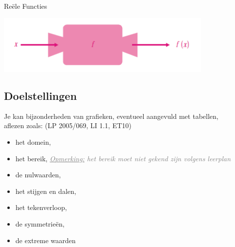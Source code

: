 \documentclass[12pt,twoside]{article}
\newcommand{\teacher}[1]{\textcolor{gray}{\emph{\underline{Opmerking:} #1}}}
\newcommand{\teacher}[1]{}
\begin{document}
\pagestyle{fancy}
\lhead{}

\begin{theorie}

  \thispagestyle{empty}
  \begin{center}
    \begin{mdframed}
      \centering
      \fontsize{35}{70}\selectfont Reële Functies
    \end{mdframed}
    \vfill
    \includegraphics[width=0.8\textwidth]{FunctieMachine}
    \vfill
  \end{center}
  \vspace*{-2cm}
  \subsection*{Doelstellingen}
  {\singlespacing

    Je kan bijzonderheden van grafieken,
    eventueel aangevuld met tabellen,\\ aflezen zoals: \hfill  {\scriptsize(LP 2005/069, LI 1.1, ET10)}
    \begin{itemize}
    \item het domein,
    \item het bereik, \teacher{het bereik moet niet gekend zijn volgens leerplan}
    \item de nulwaarden,
    \item het stijgen en dalen,
    \item het tekenverloop,
    \item de symmetrieën,
    \item de extreme waarden
    \end{itemize}
  }


\thispagestyle{empty}
\mbox{}
\newpage
\clearpage
\thispagestyle{empty}
\tableofcontents
\newpage
\clearpage
{} 

\fancyhead[RE,LO]{}

\onehalfspacing

\pagebreak
\end{theorie}
\end{document}
